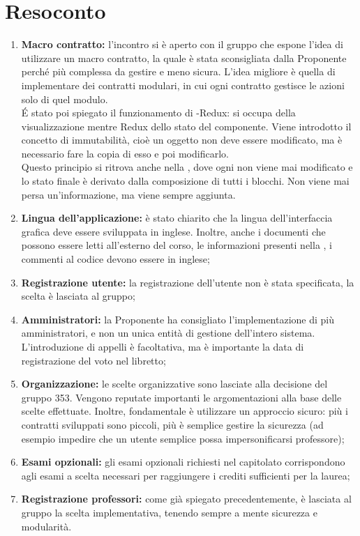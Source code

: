 \documentclass[VER-2017-12-08.tex]{subfiles}
\begin{document}
\chapter{Resoconto}
\begin{enumerate}
	\item \textbf{Macro contratto:} l'incontro si è aperto con il gruppo \gruppo che espone l'idea di utilizzare un macro contratto, la quale è stata sconsigliata dalla Proponente perché più complessa da gestire e meno sicura. L'idea migliore è quella di implementare dei contratti modulari, in cui ogni contratto gestisce le azioni solo di quel modulo.\\
	\'{E} stato poi spiegato il funzionamento di -Redux:  si occupa della visualizzazione mentre Redux dello stato del componente. Viene introdotto il concetto di immutabilità, cioè un oggetto non deve essere modificato, ma è necessario fare la copia di esso e poi modificarlo.\\
	Questo principio si ritrova anche nella , dove ogni  non viene mai modificato e lo stato finale è derivato dalla composizione di tutti i blocchi. Non viene mai persa un'informazione, ma viene sempre aggiunta.
	
	\item \textbf{Lingua dell'applicazione:} è stato chiarito che la lingua dell'interfaccia grafica deve essere sviluppata in inglese. Inoltre, anche i documenti che possono essere letti all'esterno del corso, le informazioni presenti nella  , i commenti al codice devono essere in inglese;
	
	\item \textbf{Registrazione utente:} la registrazione dell'utente non è stata specificata, la scelta è lasciata al gruppo;
	
	\item \textbf{Amministratori:} la Proponente ha consigliato l'implementazione di più amministratori, e non un unica entità di gestione dell'intero sistema. L'introduzione di appelli è facoltativa, ma è importante la data di registrazione del voto nel libretto;
	
	\item \textbf{Organizzazione:} le scelte organizzative sono lasciate alla decisione del gruppo 353. Vengono reputate importanti le argomentazioni alla base delle scelte effettuate. Inoltre, fondamentale è utilizzare un approccio sicuro: più i contratti sviluppati sono piccoli, più è semplice gestire la sicurezza (ad esempio impedire che un utente semplice possa impersonificarsi professore);
	
	\item \textbf{Esami opzionali:} gli esami opzionali richiesti nel capitolato corrispondono agli esami a scelta necessari per raggiungere i crediti sufficienti per la laurea;
	
	\item \textbf{Registrazione professori:} come già spiegato precedentemente, è lasciata al gruppo la scelta implementativa, tenendo sempre a mente sicurezza e modularità.
\end{enumerate}
\end{document}
